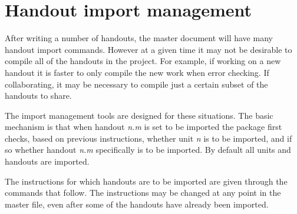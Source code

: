 \documentclass[10pt,oneside,letterpaper]{article}
\begin{document}
\section{Handout import management}


After writing a number of handouts, the master document will have many handout import  commands. 
However at a given time it may not be desirable to compile all of the handouts in the project.
For example, if working on a new handout it is faster to only compile the new work when error checking.
If collaborating, it may be necessary to compile just a certain subset of the handouts to share.

The import management tools are designed for these situations.
The basic mechanism is that when handout \emph{n.m} is set to be imported the package first checks, based on previous instructions, whether 
	unit \emph{n} is to be imported, and if so whether handout \emph{n.m} specifically is to be imported.
By default all units and handouts are imported.

The instructions for which handouts are to be imported are given through the commands that follow.
The instructions may be changed at any point in the master file, even after some of the handouts have already been imported.
\end{document}
